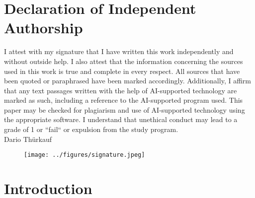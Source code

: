 \documentclass[12pt,a4paper,titlepage,oneside,english]{article}
\begin{document}
\section*{Declaration of Independent Authorship}
I attest with my signature that I have written this work independently and without outside help. I also attest that the information concerning the sources used in this work is true and complete in every respect. All sources that have been quoted or paraphrased have been marked accordingly. 
Additionally, I affirm that any text passages written with the help of AI-supported technology are marked as such, including a reference to the AI-supported program used. This paper may be checked for plagiarism and use of AI-supported technology using the appropriate software. I understand that unethical conduct may lead to a grade of 1 or ``fail`` or expulsion from the study program.\\

Dario Thürkauf

\begin{figure}[h!]
	\centering
	\hspace{-10cm}
	\texttt{[image: ../figures/signature.jpeg]}
\end{figure}

\newpage
\onehalfspacing
{}



\section{Introduction}
\end{document}
